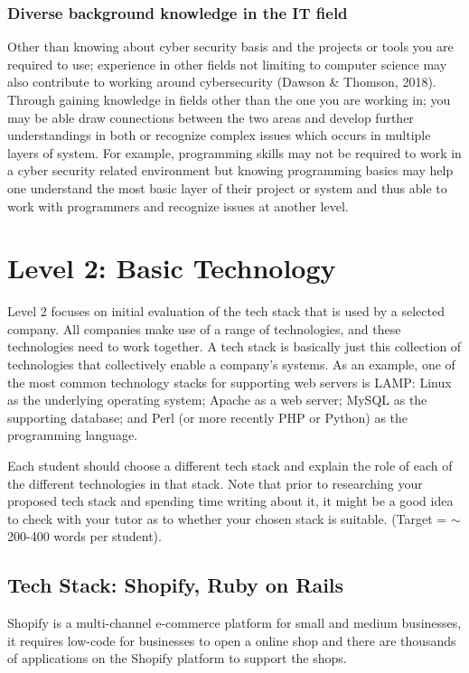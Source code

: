 \documentclass[a4paper, 11pt]{report}
\begin{document}
\subsubsection{Diverse background knowledge in the IT field}
Other than knowing about cyber security basis and the projects or tools you are required to use; experience in other fields not limiting to computer science may also contribute to working around cybersecurity (Dawson & Thomson, 2018). Through gaining knowledge in fields other than the one you are working in; you may be able draw connections between the two areas and develop further understandings in both or recognize complex issues which occurs in multiple layers of system. For example, programming skills may not be required to work in a cyber security related environment but knowing programming basics may help one understand the most basic layer of their project or system and thus able to work with programmers and recognize issues at another level.  




\newpage
\section{Level 2: Basic Technology}

Level 2 focuses on initial evaluation of the tech stack that is used by a selected company. All companies make use of a range of technologies, and these technologies need to work together. A tech stack is basically just this collection of technologies that collectively enable a company's systems. As an example, one of the most common technology stacks for supporting web servers is LAMP: Linux as the underlying operating system; Apache as a web server; MySQL as the supporting database; and Perl (or more recently PHP or Python) as the programming language.

Each student should choose a different tech stack and explain the role of each of the different technologies in that stack. Note that prior to researching your proposed tech stack and spending time writing about it, it might be a good idea to check with your tutor as to whether your chosen stack is suitable. (Target = $\sim$200-400 words per student).

\subsection{Tech Stack: Shopify, Ruby on Rails}
\indent Shopify is a multi-channel e-commerce platform for small and medium businesses, it requires low-code for businesses to open a online shop and there are thousands of applications on the Shopify platform to support the shops.
\end{document}
